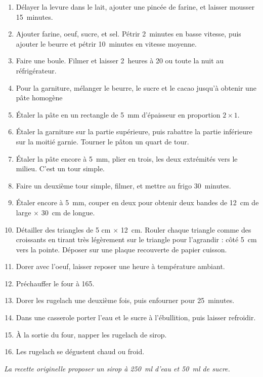 \begin{recipe}
  \begin{enumerate}

  \item Délayer la levure dans le lait, ajouter une pincée de farine,
    et laisser mousser 15~minutes.

  \item Ajouter farine, oeuf, sucre, et sel.  Pétrir 2~minutes en
    basse vitesse, puis ajouter le beurre et pétrir 10~minutes en
    vitesse moyenne.

  \item Faire une boule.  Filmer et laisser 2~heures à 20\degreeC{} ou
    toute la nuit au réfrigérateur.

  \item Pour la garniture, mélanger le beurre, le sucre et le cacao
    jusqu'à obtenir une pâte homogène

  \item Étaler la pâte en un rectangle de 5~mm d'épaisseur en
    proportion $2\times 1$.

  \item Étaler la garniture sur la partie supérieure, puis rabattre la
    partie inférieure sur la moitié garnie.  Tourner le pâton un quart
    de tour.

  \item Étaler la pâte encore à 5~mm, plier en trois, les deux
    extrémités vers le milieu.  C'est un tour simple.

  \item Faire un deuxième tour simple, filmer, et mettre au frigo
    30~minutes.

  \item Étaler encore à 5~mm, couper en deux pour obtenir deux bandes
    de 12~cm de large $\times$ 30~cm de longue.

  \item Détailler des triangles de 5 cm $\times$ 12~cm.  Rouler chaque
    triangle comme des croissants en tirant très légèrement sur le
    triangle pour l'agrandir : côté 5~cm vers la pointe.  Déposer sur
    une plaque recouverte de papier cuisson.

  \item Dorer avec l'oeuf, laisser reposer une heure à température
    ambiant.

  \item Préchauffer le four à 165\degreeC.

  \item Dorer les rugelach une deuxième fois, puis enfourner pour
    25~minutes.

  \item Dans une casserole porter l'eau et le sucre à l'ébullition,
    puis laisser refroidir.

  \item À la sortie du four, napper les rugelach de sirop.

  \item Les rugelach se dégustent chaud ou froid.


  \end{enumerate}
\end{recipe}

\textit{La recette originelle proposer un sirop à 250~ml d'eau et 50~ml de sucre.}

